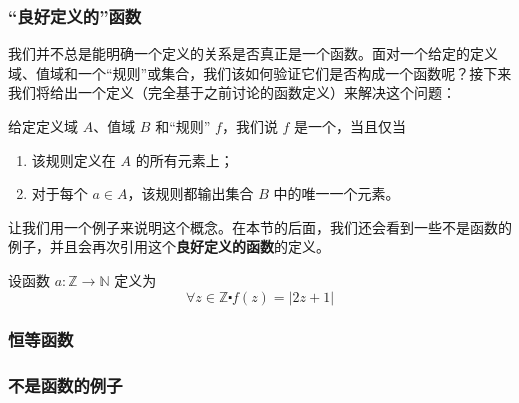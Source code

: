 \subsubsection*{``良好定义的''函数}

我们并不总是能明确一个定义的关系是否真正是一个函数。面对一个给定的定义域、值域和一个``规则''或集合，我们该如何验证它们是否构成一个函数呢？接下来我们将给出一个定义（完全基于之前讨论的函数定义）来解决这个问题：

\begin{definition}
    给定定义域 $A$、值域 $B$ 和``规则'' $f$，我们说 $f$ 是一个，当且仅当
    \begin{enumerate}[label=(\arabic*)]
        \item 该规则定义在 $A$ 的所有元素上；
        \item 对于每个 $a \in A$，该规则都输出集合 $B$ 中的唯一一个元素。
    \end{enumerate}
\end{definition}

让我们用一个例子来说明这个概念。在本节的后面，我们还会看到一些不是函数的例子，并且会再次引用这个\textbf{良好定义的函数}的定义。\\

\begin{example}
    设函数 $a : \mathbb{Z} \to \mathbb{N}$ 定义为
    \[\forall z \in \mathbb{Z} \centerdot f(z) = |2z + 1|\]
    
\end{example}

\subsubsection*{恒等函数}

\subsubsection*{不是函数的例子}